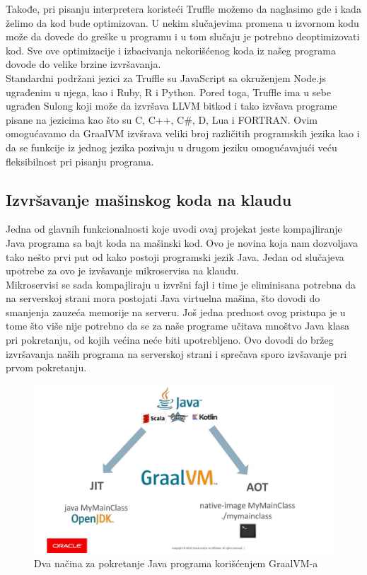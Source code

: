 \documentclass[a4paper]{article}
\begin{document}
 Takođe, pri pisanju interpretera koristeći Truffle možemo da naglasimo gde i kada želimo da kod bude optimizovan. U nekim slučajevima promena u izvornom kodu može da dovede do greške u programu i u tom slučaju je potrebno deoptimizovati kod. Sve ove optimizacije i izbacivanja nekorišćenog koda iz našeg programa dovode do velike brzine izvršavanja. \\

Standardni podržani jezici za Truffle su JavaScript sa okruženjem Node.js ugrađenim u njega, kao i Ruby, R i Python. Pored toga, Truffle ima u sebe ugrađen Sulong koji može da izvršava LLVM bitkod i tako izvšava programe pisane na jezicima kao što su C, C++, C\#, D, Lua i FORTRAN. Ovim omogućavamo da GraalVM izvšrava veliki broj različitih programskih jezika kao i da se funkcije iz jednog jezika pozivaju u drugom jeziku omogućavajući veću fleksibilnost pri pisanju programa.

\subsection{Izvršavanje mašinskog koda na klaudu}
\label{sub:Izvršavanje mašinskog koda na klaudu}

Jedna od glavnih funkcionalnosti koje uvodi ovaj projekat jeste kompajliranje Java programa sa bajt koda na mašinski kod. Ovo je novina koja nam dozvoljava tako nešto prvi put od kako postoji programski jezik Java. Jedan od slučajeva upotrebe za ovo je izvšavanje mikroservisa na klaudu. \\

Mikroservisi se sada kompajliraju u izvršni fajl i time je eliminisana potrebna da na serverskoj strani mora postojati Java virtuelna mašina, što dovodi do smanjenja zauzeća memorije na serveru. Još jedna prednost ovog pristupa je u tome što više nije potrebno da se za naše programe učitava mnoštvo Java klasa pri pokretanju, od kojih većina neće biti upotrebljeno. Ovo dovodi do bržeg izvršavanja naših programa na serverskoj strani i sprečava sporo izvšavanje pri prvom pokretanju. 


\begin{figure}
	\begin{center}
	\includegraphics[scale=0.25]{imgs/run_java.jpg}
	\end{center}
	\caption{Dva načina za pokretanje Java programa korišćenjem GraalVM-a}
	\label{fig:run java}
\end{figure}
\end{document}
